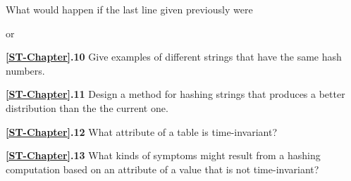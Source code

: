What would happen if the last line given previously were


or



\noindent\textbf{\ref*{ST-Chapter}.10}
Give examples of different strings that have the same hash numbers.

\noindent\textbf{\ref*{ST-Chapter}.11}
Design a method for hashing strings that produces a better
distribution than the the current one.

\noindent\textbf{\ref*{ST-Chapter}.12}
What attribute of a table is time-invariant?

 \noindent\textbf{\ref*{ST-Chapter}.13}
 What kinds of symptoms might result from a hashing computation
 based on an attribute of a value that is not time-invariant?

